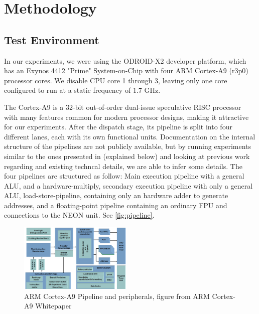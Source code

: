 \section{Methodology}


\subsection{Test Environment}
In our experiments, we were using the ODROID-X2 \cite{odroid-x2} developer
platform, which has an Exynos 4412 "Prime" System-on-Chip with four ARM
Cortex-A9 (r3p0) processor cores. We disable CPU core 1 through 3, leaving only
one core configured to run at a static frequency of $1.7$ GHz.

The Cortex-A9 is a 32-bit out-of-order dual-issue speculative RISC processor
with many features common for modern processor designs\cite{patterson}\cite{hennessy},
making it attractive for our experiments. After the dispatch stage, its pipeline
is split into four different lanes, each with its own functional units.
Documentation on the internal structure of the pipelines are not publicly
available, but by running experiments similar to the ones presented in
\cite{bircher}\cite{bertran}\cite{singh}  (explained below) and looking at previous
work regarding and existing techncal details\cite{armtech}\cite{7cpu}, we are able to infer some
details.  The four pipelines are structured as follow: Main execution pipeline
with a general ALU, and a hardware-multiply, secondary execution pipeline with
only a general ALU, load-store-pipeline, containing only an hardware adder to
generate addresses, and a floating-point pipeline containing an ordinary FPU and
connections to the NEON unit. See \autoref{fig:pipeline}.

\begin{figure}
    \begin{centering}
        \includegraphics[width=0.48\textwidth]{figures/A9-Pipeline-hres}
        \caption{ARM Cortex-A9 Pipeline and peripherals,\hfill
        figure from ARM Cortex-A9 Whitepaper\cite{a9whitepaper}}
        \label{fig:pipeline}
    \end{centering}
\end{figure}

